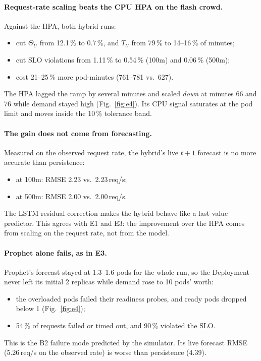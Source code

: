 \documentclass[11pt,a4paper]{article}
\begin{document}
\paragraph{Request-rate scaling beats the CPU HPA on the flash crowd.} Against the HPA, both hybrid runs:
\begin{itemize}
\item cut $\Theta_U$ from 12.1\,\% to 0.7\,\%, and $T_U$ from 79\,\% to 14--16\,\% of minutes;
\item cut SLO violations from 1.11\,\% to 0.54\,\% (100m) and 0.06\,\% (500m);
\item cost 21--25\,\% more pod-minutes (761--781 vs.\ 627).
\end{itemize}
The HPA lagged the ramp by several minutes and scaled \emph{down} at minutes 66 and 76 while demand stayed
high (Fig.~\ref{fig:e4}). Its CPU signal saturates at the pod limit and moves inside the 10\,\% tolerance band.

\paragraph{The gain does not come from forecasting.} Measured on the observed request rate, the hybrid's live
$t{+}1$ forecast is no more accurate than persistence:
\begin{itemize}
\item at 100m: RMSE 2.23 vs.\ 2.23\,req/s;
\item at 500m: RMSE 2.00 vs.\ 2.00\,req/s.
\end{itemize}
The LSTM residual correction makes the hybrid behave like a last-value predictor. This agrees with E1 and E3:
the improvement over the HPA comes from scaling on the request rate, not from the model.

\paragraph{Prophet alone fails, as in E3.} Prophet's forecast stayed at 1.3--1.6 pods for the whole run, so the
Deployment never left its initial 2 replicas while demand rose to 10 pods' worth:
\begin{itemize}
\item the overloaded pods failed their readiness probes, and ready pods dropped below 1 (Fig.~\ref{fig:e4});
\item 54\,\% of requests failed or timed out, and 90\,\% violated the SLO.
\end{itemize}
This is the B2 failure mode predicted by the simulator. Its live forecast RMSE (5.26\,req/s on the observed
rate) is worse than persistence (4.39).
\end{document}
